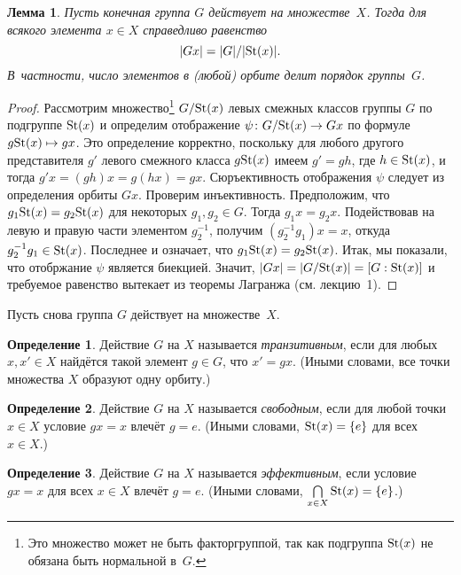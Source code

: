 \documentclass[a4paper,10pt]{amsart}
\def\St{{\rm St}}%
\newtheorem{lemma}{Лемма}
\theoremstyle{definition}
\newtheorem{definition}{Определение}
\theoremstyle{remark}
\begin{document}
\begin{lemma}
Пусть конечная группа $G$ действует на множестве~$X$. Тогда для
всякого элемента $x\in X$ справедливо равенство
$$
|Gx| = |G| / |\St(x)|.
$$
В~частности, число элементов в \textup(любой\textup) орбите делит
порядок группы~$G$.
\end{lemma}

\begin{proof}
Рассмотрим множество\footnote{Это множество может не быть
факторгруппой, так как подгруппа $\St(x)$ не обязана быть нормальной
в~$G$.} $G / \St(x)$ левых смежных классов группы $G$ по подгруппе
$\St(x)$ и определим отображение $\psi \colon G / \St(x) \to Gx$ по
формуле $g\St(x) \mapsto gx$. Это определение корректно, поскольку
для любого другого представителя $g'$ левого смежного класса
$g\St(x)$ имеем $g' = g h$, где $h \in \St(x)$, и тогда $g'x = (gh)x
= g(hx) = gx$. Сюръективность отображения $\psi$ следует из
определения орбиты $Gx$. Проверим инъективность. Предположим, что
$g_1 \St(x) = g_2 \St(x)$ для некоторых $g_1, g_2 \in G$. Тогда
$g_1x = g_2x$. Подействовав на левую и правую части элементом
$g_2^{-1}$, получим $(g_2^{-1}g_1)x = x$, откуда $g_2^{-1}g_1 \in
\St(x)$. Последнее и означает, что $g_1 \St(x) = g_2 \St(x)$. Итак,
мы показали, что отобржание $\psi$ является биекцией. Значит, $|Gx|
= |G / \St(x)| = [G : \St(x)]$ и требуемое равенство вытекает из
теоремы Лагранжа (см. лекцию~1).
\end{proof}

Пусть снова группа $G$ действует на множестве~$X$.

\begin{definition}
Действие $G$ на $X$ называется {\it транзитивным}, если для любых
$x, x' \in X$ найдётся такой элемент $g \in G$, что $x' = gx$.
(Иными словами, все точки множества $X$ образуют одну орбиту.)
\end{definition}

\begin{definition}
Действие $G$ на $X$ называется {\it свободным}, если для любой точки
$x \in X$ условие $gx=x$ влечёт $g=e$. (Иными словами, $\St(x) =
\lbrace e \rbrace$ для всех $x \in X$.)
\end{definition}

\begin{definition}
Действие $G$ на $X$ называется {\it эффективным}, если условие
$gx=x$ для всех $x\in X$ влечёт $g=e$. (Иными словами, $\bigcap
\limits_{x \in X} \St(x) = \lbrace e \rbrace$.)
\end{definition}
\end{document}
